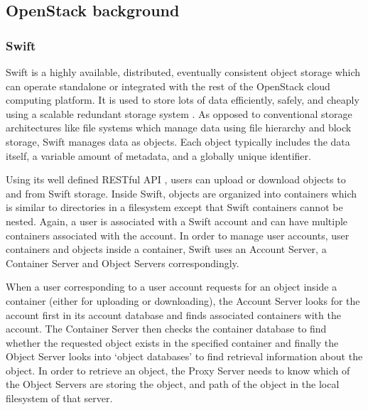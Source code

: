 \subsection{OpenStack background}

\subsubsection{Swift}

Swift is a highly available, distributed, eventually consistent object storage which can operate standalone or integrated with the rest of the OpenStack cloud computing platform. It is used  to store lots of data efficiently, safely, and cheaply using a scalable redundant storage system \cite{swift-definition}. As opposed to conventional storage architectures like file systems which manage data using file hierarchy and block storage, Swift manages data as objects. Each object typically includes the data itself, a variable amount of metadata, and a globally unique identifier.

Using its well defined RESTful API \cite{swift-api}, users can upload or download objects to and from Swift storage. Inside Swift, objects are organized into containers which is similar to directories in a filesystem except that Swift containers cannot be nested. Again, a user is associated with a Swift account and can have multiple containers associated with the account. In order to manage user accounts, user containers and objects inside a container, Swift uses an Account Server, a Container Server and Object Servers correspondingly.

When a user corresponding to a user account requests for an object inside a container (either for uploading or downloading), the Account Server looks for the account first in its account database and finds associated containers with the account. The Container Server then checks the container database to find whether the requested object exists in the specified container and finally the Object Server looks into `object databases' to find retrieval information about the object. In order to retrieve an object, the Proxy Server needs to know which of the Object Servers are storing the object, and path of the object in the local filesystem of that server.





